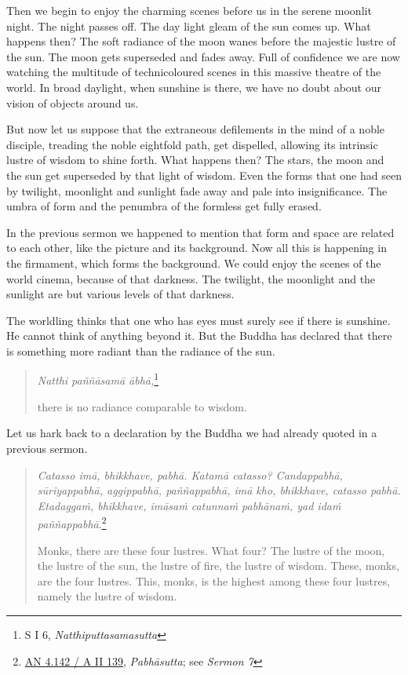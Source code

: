 Then we begin to enjoy the charming scenes before us in the serene moonlit night. The night passes off. The day light gleam of the sun comes up. What happens then? The soft radiance of the moon wanes before the majestic lustre of the sun. The moon gets superseded and fades away. Full of confidence we are now watching the multitude of technicoloured scenes in this massive theatre of the world. In broad daylight, when sunshine is there, we have no doubt about our vision of objects around us.

\enlargethispage{\baselineskip}

But now let us suppose that the extraneous defilements in the mind of a noble disciple, treading the noble eightfold path, get dispelled, allowing its intrinsic lustre of wisdom to shine forth. What happens then? The stars, the moon and the sun get superseded by that light of wisdom. Even the forms that one had seen by twilight, moonlight and sunlight fade away and pale into insignificance. The umbra of form and the penumbra of the formless get fully erased.

In the previous sermon we happened to mention that form and space are related to each other, like the picture and its background. Now all this is happening in the firmament, which forms the background. We could enjoy the scenes of the world cinema, because of that darkness. The twilight, the moonlight and the sunlight are but various levels of that darkness.

The worldling thinks that one who has eyes must surely see if there is sunshine. He cannot think of anything beyond it. But the Buddha has declared that there is something more radiant than the radiance of the sun.

\begin{quote}
\emph{Natthi paññāsamā ābhā,}\footnote{S I 6, \emph{Natthiputtasamasutta}}

there is no radiance comparable to wisdom.
\end{quote}

Let us hark back to a declaration by the Buddha we had already quoted in a previous sermon.

\begin{quote}
\emph{Catasso imā, bhikkhave, pabhā. Katamā catasso? Candappabhā, sūriyappabhā, aggippabhā, paññappabhā, imā kho, bhikkhave, catasso pabhā. Etadaggaṁ, bhikkhave, imāsaṁ catunnaṁ pabhānaṁ, yad idaṁ paññappabhā}.\footnote{\href{https://suttacentral.net/an4.142/pli/ms}{AN 4.142 / A II 139}, \emph{Pabhāsutta}; see \emph{Sermon 7}}

Monks, there are these four lustres. What four? The lustre of the moon, the lustre of the sun, the lustre of fire, the lustre of wisdom. These, monks, are the four lustres. This, monks, is the highest among these four lustres, namely the lustre of wisdom.
\end{quote}

